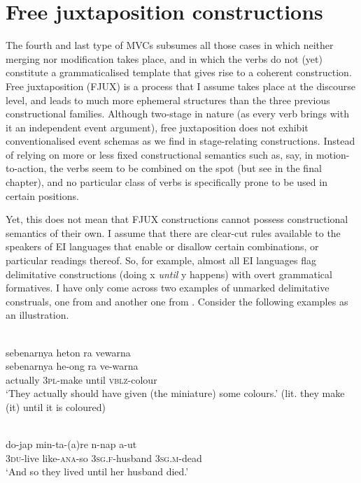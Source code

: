 \section{Free juxtaposition constructions} \label{sec:fjux}

The fourth and last type of MVCs subsumes all those cases in which neither merging nor modification takes place, and in which the verbs do not (yet) constitute a grammaticalised template that gives rise to a coherent construction. Free juxtaposition (FJUX) is a process that I assume takes place at the discourse level, and leads to much more ephemeral structures than the three previous constructional families. Although two-stage in nature (as every verb brings with it an independent event argument), free juxtaposition does not exhibit conventionalised event schemas as we find in stage-relating constructions. Instead of relying on more or less fixed constructional semantics such as, say, in motion-to-action, the verbs seem to be combined on the spot (but see  in the final chapter), and no particular class of verbs is specifically prone to be used in certain positions. 

Yet, this does not mean that FJUX constructions cannot possess constructional semantics of their own. I assume that there are clear-cut rules available to the speakers of EI languages that enable or disallow certain combinations, or particular readings thereof. So, for example, almost all EI languages flag delimitative constructions (doing x \textit{until} y happens) with overt grammatical formatives. I have only come across two examples of unmarked delimitative construals, one from  and another one from . Consider the following examples as an illustration. 

\ea \label{Wooi_delim}
\\
\glll sebenarnya heton ra vewarna \\
sebenarnya he-ong ra ve-warna \\
actually 3\textsc{pl}-make until \textsc{vblz}-colour \\
\glft `They actually should have given (the miniature) some colours.' (lit. they make (it) until it is coloured)\\ 
\z

\ea \label{Mpur_19}
\\
\gll do-jap min-ta-(a)re n-nap a-ut \\
3\textsc{du}-live like-\textsc{ana}-so 3\textsc{sg}.\textsc{f}-husband 3\textsc{sg}.\textsc{m}-dead \\
\glft `And so they lived until her husband died.'\\ 
\z

